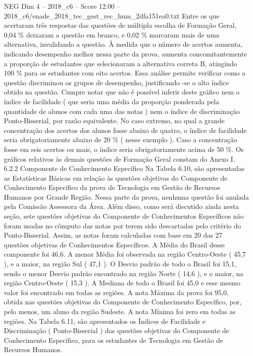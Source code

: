 \begin{textsample}{NEG Dim 4 – 2018\_c6 – Score 12.00 – 2018\_c6/enade\_2018\_tec\_gest\_rec\_hum\_2dfa151ea0.txt}
Entre os que acertaram três respostas das questões de múltipla escolha de Formação Geral, 0,04 \% deixaram a questão em branco, e 0,02 \% marcaram mais de uma alternativa, invalidando a questão.
À medida que o número de acertos aumenta, indicando desempenho melhor nessa parte da prova, aumenta concomitantemente a proporção de estudantes que selecionaram a alternativa correta B, atingindo 100 \% para os estudantes com oito acertos.
Essa análise permite verificar como a questão discriminou os grupos de desempenho, justificando -se o alto índice obtido na questão.
Cumpre notar que não é possível inferir deste gráfico nem o índice de facilidade ( que seria uma média da proporção ponderada pela quantidade de alunos com cada uma das notas ) nem o índice de discriminação Ponto-Bisserial, por razão equivalente.
No caso extremo, no qual a grande concentração dos acertos dos alunos fosse abaixo de quatro, o índice de facilidade seria obrigatoriamente abaixo de 20 \% ( nesse exemplo ).
Caso a concentração fosse em seis acertos ou mais, o índice seria obrigatoriamente acima de 50 \%.
Os gráficos relativos às demais questões de Formação Geral constam do Anexo I. 6.2.2 Componente de Conhecimento Específico Na Tabela 6.10, são apresentadas as Estatísticas Básicas em relação às questões objetivas do Componente de Conhecimento Específico da prova de Tecnologia em Gestão de Recursos Humanos por Grande Região.
Nessa parte da prova, nenhuma questão foi anulada pela Comissão Assessora da Área.
Além disso, como será discutido ainda nesta seção, sete questões objetivas do Componente de Conhecimentos Específicos não foram usadas no cômputo das notas por terem sido descartadas pelo critério do Ponto-Bisserial.
Assim, as notas foram calculadas com base em 20 das 27 questões objetivas de Conhecimentos Específicos.
A Média do Brasil desse componente foi 46,6.
A menor Média foi observada na região Centro-Oeste ( 45,7 ), e a maior, na região Sul ( 47,1 ).
O Desvio padrão de todo o Brasil foi 15,1, sendo o menor Desvio padrão encontrado na região Norte ( 14,6 ), e o maior, na região Centro-Oeste ( 15,3 ).
A Mediana de todo o Brasil foi 45,0 e esse mesmo valor foi encontrado em todas as regiões.
A nota Máxima da prova foi 95,0, obtida nas questões objetivas do Componente de Conhecimento Específico, por, pelo menos, um aluno da região Sudeste.
A nota Mínima foi zero em todas as regiões.
Na Tabela 6.11, são apresentados os Índices de Facilidade e Discriminação ( Ponto-Bisserial ) das questões objetivas do Componente de Conhecimento Específico, para os estudantes de Tecnologia em Gestão de Recursos Humanos.

\end{textsample}
